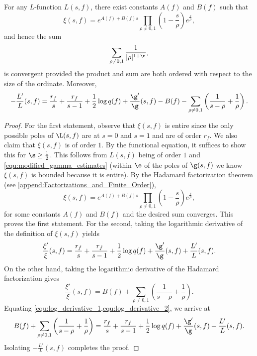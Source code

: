     \begin{proposition}\label{prop:explicit_formula_log_derivative}
      For any $L$-function $L(s,f)$, there exist constants $A(f)$ and $B(f)$ such that
      \[
        \xi(s,f) = e^{A(f)+B(f)s}\prod_{\rho \neq 0,1}\left(1-\frac{s}{\rho}\right)e^{\frac{s}{\rho}},
      \]
      and hence the sum
      \[
        \sum_{\rho \neq 0,1}\frac{1}{|\rho|^{1+\e}},
      \]
      is convergent provided the product and sum are both ordered with respect to the size of the ordinate. Moreover,
      \[
        -\frac{L'}{L}(s,f) = \frac{r_{f}}{s}+\frac{r_{f}}{s-1}+\frac{1}{2}\log{q(f)}+\frac{\g'}{\g}(s,f)-B(f)-\sum_{\rho \neq 0,1}\left(\frac{1}{s-\rho}+\frac{1}{\rho}\right).
      \]
    \end{proposition}
    \begin{proof}
      For the first statement, observe that $\xi(s,f)$ is entire since the only possible poles of $\L(s,f)$ are at $s = 0$ and $s = 1$ and are of order $r_{f}$. We also claim that $\xi(s,f)$ is of order $1$. By the functional equation, it suffices to show this for $\s \ge \frac{1}{2}$. This follows from $L(s,f)$ being of order $1$ and \cref{equ:modified_gamma_estimates} (within $\e$ of the poles of $\g(s,f)$ we know $\xi(s,f)$ is bounded because it is entire). By the Hadamard factorization theorem (see \cref{append:Factorizations_and_Finite_Order}),
       \[
        \xi(s,f) = e^{A(f)+B(f)s}\prod_{\rho \neq 0,1}\left(1-\frac{s}{\rho}\right)e^{\frac{s}{\rho}},
      \]
      for some constants $A(f)$ and $B(f)$ and the desired sum converges. This proves the first statement. For the second, taking the logarithmic derivative of the definition of $\xi(s,f)$ yields
      \begin{equation}\label{equ:log_derivative_1}
        \frac{\xi'}{\xi}(s,f) = \frac{r_{f}}{s}+\frac{r_{f}}{s-1}+\frac{1}{2}\log{q(f)}+\frac{\g'}{\g}(s,f)+\frac{L'}{L}(s,f).
      \end{equation}
      On the other hand, taking the logarithmic derivative of the Hadamard factorization gives
      \begin{equation}\label{equ:log_derivative_2}
        \frac{\xi'}{\xi}(s,f) = B(f)+\sum_{\rho \neq 0,1}\left(\frac{1}{s-\rho}+\frac{1}{\rho}\right).
      \end{equation}
      Equating \cref{equ:log_derivative_1,equ:log_derivative_2}, we arrive at
      \[
        B(f)+\sum_{\rho \neq 0,1}\left(\frac{1}{s-\rho}+\frac{1}{\rho}\right) = \frac{r_{f}}{s}+\frac{r_{f}}{s-1}+\frac{1}{2}\log{q(f)}+\frac{\g'}{\g}(s,f)+\frac{L'}{L}(s,f).
      \]
      Isolating $-\frac{L'}{L}(s,f)$ completes the proof.
    \end{proof}

